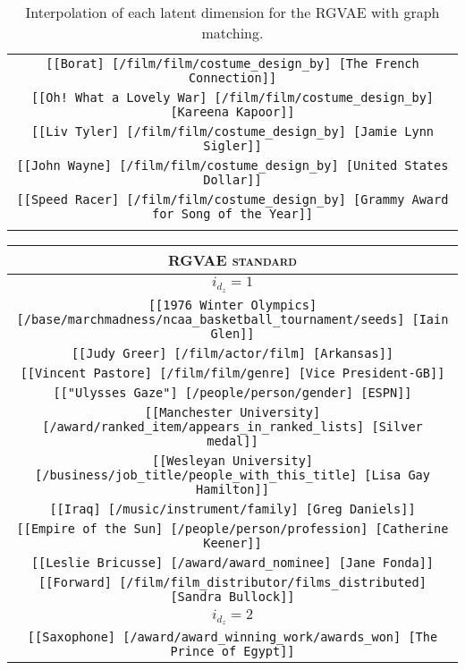 \begin{longtable}{|c|}
    \texttt{[[Borat] [/film/film/costume\_design\_by] [The French Connection]]}\\
    \texttt{[[Oh! What a Lovely War] [/film/film/costume\_design\_by] [Kareena Kapoor]]}\\
    \texttt{[[Liv Tyler] [/film/film/costume\_design\_by] [Jamie Lynn Sigler]]}\\
    \texttt{[[John Wayne] [/film/film/costume\_design\_by] [United States Dollar]]}\\
    \texttt{[[Speed Racer] [/film/film/costume\_design\_by] [Grammy Award for Song of the Year]]}\\
    \hline
\caption{Interpolation of each latent dimension for the RGVAE with graph matching.}
\label{annexA:ipdim95}
\end{longtable}


\begin{longtable}{|c|}
    \hline
    \rowcolor[HTML]{EFEFEF} 
    \textsc{RGVAE standard}\\ \hline
    \rowcolor[HTML]{EFEFEF} 
    \textsc{$i_{d_z}=1$}\\ \hline
    \texttt{[[1976 Winter Olympics] [/base/marchmadness/ncaa\_basketball\_tournament/seeds] [Iain Glen]]}\\
    \texttt{[[Judy Greer] [/film/actor/film] [Arkansas]]}\\
    \texttt{[[Vincent Pastore] [/film/film/genre] [Vice President-GB]]}\\
    \texttt{[["Ulysses Gaze"] [/people/person/gender] [ESPN]]}\\
    \texttt{[[Manchester University] [/award/ranked\_item/appears\_in\_ranked\_lists] [Silver medal]]}\\
    \texttt{[[Wesleyan University] [/business/job\_title/people\_with\_this\_title] [Lisa Gay Hamilton]]}\\
    \texttt{[[Iraq] [/music/instrument/family] [Greg Daniels]]}\\
    \texttt{[[Empire of the Sun] [/people/person/profession] [Catherine Keener]]}\\
    \texttt{[[Leslie Bricusse] [/award/award\_nominee] [Jane Fonda]]}\\
    \texttt{[[Forward] [/film/film\_distributor/films\_distributed] [Sandra Bullock]]}\\
    \hline
    \rowcolor[HTML]{EFEFEF} 
    \textsc{$i_{d_z}=2$}\\ \hline
    \texttt{[[Saxophone] [/award/award\_winning\_work/awards\_won] [The Prince of Egypt]]}\\

\end{longtable}
